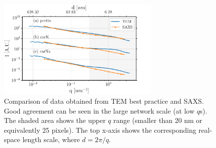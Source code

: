 \begin{figure}[!h]
    \centering
    \noindent\includegraphics[width=0.7\textwidth]{Figures/chapter-temsaxs/saxs-tem-merged.pdf}
    \caption{Comparison of data obtained from TEM best practice and SAXS. Good agreement can be seen in the large network scale (at low $q$s). The shaded area shows the upper $q$ range (smaller than 20 \si{\nm} or equivalently 25 pixels). The top x-axis shows the corresponding real-space length scale, where $d = 2\pi/q$.} \label{fig:TEM_vs_SAXS}
\end{figure}

